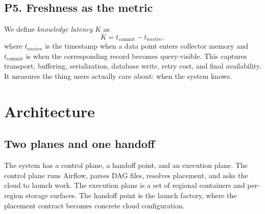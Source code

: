 \documentclass[11pt, reqno]{amsart}
\newcommand{\kmetric}{\emph{knowledge latency}}
\begin{document}
\subsection{P5. Freshness as the metric}

We define \kmetric{} $K$ as
$$
K = t_{\mathrm{commit}} - t_{\mathrm{receive}},
$$
where $t_{\mathrm{receive}}$ is the timestamp when a data point enters collector memory and $t_{\mathrm{commit}}$ is when the corresponding record becomes query-visible. This captures transport, buffering, serialization, database write, retry cost, and final availability. It measures the thing users actually care about: when the system knows.

\section{Architecture}
\label{sec:architecture}

\subsection{Two planes and one handoff}

The system has a control plane, a handoff point, and an execution plane. The control plane runs Airflow, parses DAG files, resolves placement, and asks the cloud to launch work. The execution plane is a set of regional containers and per-region storage surfaces. The handoff point is the launch factory, where the placement contract becomes concrete cloud configuration.
\end{document}
